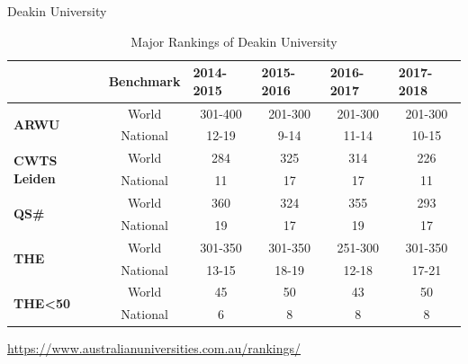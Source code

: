\documentclass[
 size=14pt,
 paper=smartboard,  %
 mode=present, 		%
 display=slides, 	%
 style=tuliplab,  	%
 pauseslide,
 fleqn,leqno]{powerdot}{}
\begin{document}


\begin{slide}[toc=,bm=]{Deakin University}
	\begin{table}[htbp]
		\setlength{\abovecaptionskip}{-21pt}
		\setlength{\belowcaptionskip}{12pt}
		\centering
		\caption{Major Rankings of Deakin University}
		\begin{tabular}{l|c|cccc}
			\toprule
			& \textbf{Benchmark} & \multicolumn{1}{l}{\textbf{2014-2015}} & \multicolumn{1}{l}{\textbf{2015-2016}} & \multicolumn{1}{l}{\textbf{2016-2017}} & \multicolumn{1}{l}{\textbf{2017-2018}} \\ \midrule
			\multirow{2}[0]{*}{\textbf{ARWU}} & World & 301-400 & 201-300 & 201-300 & 201-300 \\
			& National  & 12-19 & 9-14  & 11-14  & 10-15 \\
			\midrule
			\multirow{2}[0]{*}{\textbf{CWTS Leiden}} & World  & 284 & 325 & 314 & 226 \\
			& National  & 11 & 17 & 17 & 11 \\
			\midrule
			\multirow{2}[0]{*}{\textbf{QS\#}} & World  & 360 & 324 & 355 & 293 \\
			& National & 19 & 17 & 19  & 17 \\
			\midrule
			\multirow{2}[0]{*}{\textbf{THE} } & World  & 301-350 & 301-350 & 251-300 & 301-350 \\
			& National  & 13-15 & 18-19  & 12-18  & 17-21 \\
			\midrule
			\multirow{2}[0]{*}{\textbf{THE<50}} & World  & 45 & 50 & 43  & 50 \\
			& National  & 6 & 8  & 8  & 8 \\
			\bottomrule
		\end{tabular}
		\label{tab:Deakin Ranking}
	\end{table}
	\centering
	\url{https://www.australianuniversities.com.au/rankings/}
\end{slide}

\end{document}
